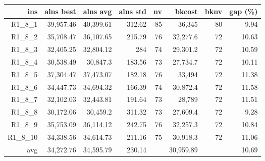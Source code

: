   \begin{table}[caption={Kết quả đo với tập HG\_R\_1\_8 800 yêu cầu}, label=exp:HGR18]
    \small
    \centering
    \begin{tabular}{rrrrrrrr}
    \hline
    ins & alns best & alns avg & alns std & nv & bkcost & bknv & gap (\%) \\ \hline
    R1\_8\_1 & 39,957.46 & 40,399.61 & 312.62 & 85 & 36,345 & 80 & 9.94 \\ \hline
    R1\_8\_2 & 35,708.47 & 36,107.65 & 215.79 & 76 & 32,277.6 & 72 & 10.63 \\ \hline
    R1\_8\_3 & 32,405.25 & 32,804.12 & 284 & 74 & 29,301.2 & 72 & 10.59 \\ \hline
    R1\_8\_4 & 30,538.49 & 30,847.3 & 183.56 & 73 & 27,734.7 & 72 & 10.11 \\ \hline
    R1\_8\_5 & 37,304.47 & 37,473.07 & 182.18 & 76 & 33,494 & 72 & 11.38 \\ \hline
    R1\_8\_6 & 34,447.73 & 34,694.32 & 166.39 & 74 & 30,872.4 & 72 & 11.58 \\ \hline
    R1\_8\_7 & 32,102.03 & 32,443.81 & 191.64 & 73 & 28,789 & 72 & 11.51 \\ \hline
    R1\_8\_8 & 30,172.06 & 30,459.2 & 311.32 & 73 & 27,609.4 & 72 & 9.28 \\ \hline
    R1\_8\_9 & 35,753.09 & 36,114.12 & 242.75 & 76 & 32,257.3 & 72 & 10.84 \\ \hline
    R1\_8\_10 & 34,338.56 & 34,614.73 & 211.16 & 75 & 30,918.3 & 72 & 11.06 \\ \hline
    avg & 34,272.76 & 34,595.79 & 230.14 & & 30,959.89 & & 10.69 \\ \hline
    \end{tabular}
  \end{table}

